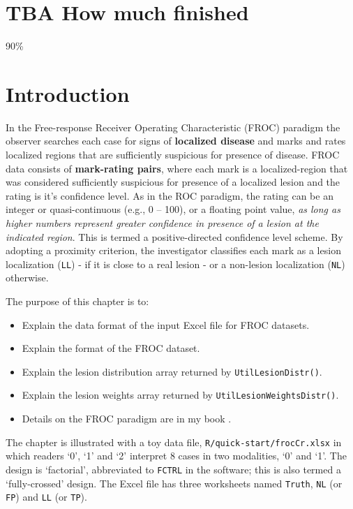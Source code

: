 \documentclass[
]{book}
\providecommand{\tightlist}{%
  \setlength{\itemsep}{0pt}\setlength{\parskip}{0pt}}
\begin{document}
\hypertarget{quick-start-froc-data-format-how-much-finished}{%
\section{TBA How much finished}\label{quick-start-froc-data-format-how-much-finished}}

90\%

\hypertarget{quick-start-froc-data-intro}{%
\section{Introduction}\label{quick-start-froc-data-intro}}

In the Free-response Receiver Operating Characteristic (FROC) paradigm the observer searches each case for signs of \textbf{localized disease} and marks and rates localized regions that are sufficiently suspicious for presence of disease. FROC data consists of \textbf{mark-rating pairs}, where each mark is a localized-region that was considered sufficiently suspicious for presence of a localized lesion and the rating is it's confidence level. As in the ROC paradigm, the rating can be an integer or quasi-continuous (e.g., 0 -- 100), or a floating point value, \emph{as long as higher numbers represent greater confidence in presence of a lesion at the indicated region}. This is termed a positive-directed confidence level scheme. By adopting a proximity criterion, the investigator classifies each mark as a lesion localization (\texttt{LL}) - if it is close to a real lesion - or a non-lesion localization (\texttt{NL}) otherwise.

The purpose of this chapter is to:

\begin{itemize}
\tightlist
\item
  Explain the data format of the input Excel file for FROC datasets.
\item
  Explain the format of the FROC dataset.
\item
  Explain the lesion distribution array returned by \texttt{UtilLesionDistr()}.
\item
  Explain the lesion weights array returned by \texttt{UtilLesionWeightsDistr()}.
\item
  Details on the FROC paradigm are in my book \citep{chakraborty2017observer}.
\end{itemize}

The chapter is illustrated with a toy data file, \texttt{R/quick-start/frocCr.xlsx} in which readers `0', `1' and `2' interpret 8 cases in two modalities, `0' and `1'. The design is `factorial', abbreviated to \texttt{FCTRL} in the software; this is also termed a `fully-crossed' design. The Excel file has three worksheets named \texttt{Truth}, \texttt{NL} (or \texttt{FP}) and \texttt{LL} (or \texttt{TP}).
\end{document}
